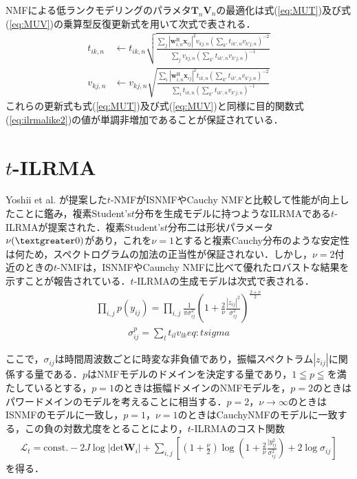 NMFによる低ランクモデリングのパラメタ$\bm{T}_n\bm{V}_n$の最適化は式(\ref{eq:MUT})及び式(\ref{eq:MUV})の乗算型反復更新式を用いて次式で表される．
\begin{align}
t_{ik, n} &\leftarrow  t_{ik, n} \sqrt{ \frac{ \sum_{j} | \bm{w}_{i,n}^{\mathrm{H}}\bm{x}_{ij} |^2 v_{kj, n} ( \sum_{k'} t_{ik', n} v_{k'j, n} )^{-2} }{ \sum_{j} v_{kj, n} ( \sum_{k'} t_{ik', n} v_{k'j, n} )^{-1} } } \label{eq:t} \\
v_{kj, n} &\leftarrow  v_{kj, n} \sqrt{ \frac{ \sum_{i} | \bm{w}_{i,n}^{\mathrm{H}}\bm{x}_{ij} |^2 t_{ik, n} ( \sum_{k'} t_{ik', n} v_{k'j, n} )^{-2} }{ \sum_{i} t_{ik, n} ( \sum_{k'} t_{ik', n} v_{k'j, n} )^{-1} } } \label{eq:v}
\end{align}
これらの更新式も式(\ref{eq:MUT})及び式(\ref{eq:MUV})と同様に目的関数式(\ref{eq:ilrmalike2})の値が単調非増加であることが保証されている．

\section{$t$-ILRMA}
\label{sec:conv:tilrma}

Yoshii et al. が提案した$t$-NMFがISNMFやCauchy NMFと比較して性能が向上したことに鑑み，複素Student's$t$分布を生成モデルに持つようなILRMAである$t$-ILRMAが提案された．複素Student's$t$分布二は形状パラメータ$\nu(\textgreater0)$があり，これを$\nu=1$とすると複素Cauchy分布のような安定性は何ため，スペクトログラムの加法の正当性が保証されない．しかし，$\nu=2$付近のときの$t$-NMFは，ISNMFやCaunchy NMFに比べて優れたロバストな結果を示すことが報告されている．$t$-ILRMAの生成モデルは次式で表される．
\begin{align}
     \prod_{i,j}p\left(y_{ij}\right)= \prod_{i,j} \frac{1}{\pi \sigma_{ij}^{2} } \left( 1+\frac{2}{\nu}\frac{|z_{ij}|^2}{\sigma_{ij}^{2}} \right)^{\frac{2+\nu}{2}}　\label{eq:tmodel}
\end{align}
\begin{align}
     \sigma_{ij}^{p}=\sum_{l}t_{il}v_{lk}{eq:tsigma}
\end{align}

ここで，$\sigma_{ij}$は時間周波数ごとに時変な非負値であり，振幅スペクトラム$|z_{ij}|$に関係する量である．$p$はNMFモデルのドメインを決定する量であり，$1\leqq p \leqq$を満たしているとする，$p=1$のときは振幅ドメインのNMFモデルを，$p=2$のときはパワードメインのモデルを考えることに相当する．$p=2$，$\nu\rightarrow\infty$のときはISNMFのモデルに一致し，$p=1$，$\nu=1$のときはCauchyNMFのモデルに一致する，この負の対数尤度をとることにより，$t$-ILRMAのコスト関数
\begin{align}
    \mathcal{L}_{t} = \mathrm{const.}-2J\log|\mathrm{det}\bm{W}_{i}|+\sum_{i,j}\left\lbrack\left(1+\frac{\nu}{2}\right)\log\left(1+\frac{2}{\nu}\frac{|y_{ij}^{2}}{\sigma_{ij}^{2}}\right)+2\log\sigma_{ij}\right\rbrack \label{eq:tcost}
\end{align}
を得る．

